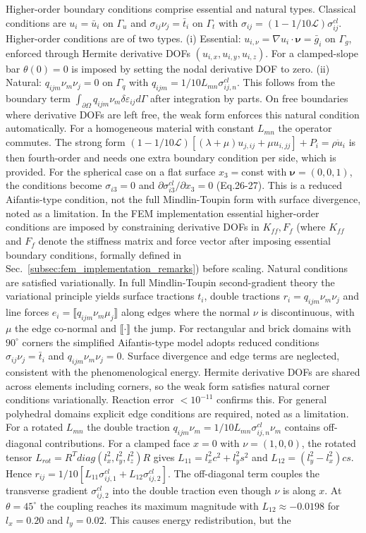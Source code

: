 \documentclass[final,3p,times,fleqn]{elsarticle}
\begin{document}
Higher-order boundary conditions comprise essential and natural types. Classical conditions are $u_i=\bar{u}_i$ on $\Gamma_u$ and $\sigma_{ij}\nu_j=\bar{t}_i$ on $\Gamma_t$ with $\sigma_{ij}=(1-1/10\mathcal{L})\sigma^{cl}_{ij}$. Higher-order conditions are of two types. (i) Essential: $u_{i,\nu}=\nabla u_i\cdot\boldsymbol{\nu}=\bar{g}_i$ on $\Gamma_g$, enforced through Hermite derivative DOFs $(u_{i,x},u_{i,y},u_{i,z})$. For a clamped-slope bar $\theta(0)=0$ is imposed by setting the nodal derivative DOF to zero. (ii) Natural: $q_{ijm}\nu_m\nu_j=0$ on $\Gamma_q$ with $q_{ijm}=1/10 L_{mn}\sigma^{cl}_{ij,n}$. This follows from the boundary term $\int_{\partial\Omega} q_{ijm}\nu_m\delta\varepsilon_{ij} d\Gamma$ after integration by parts. On free boundaries where derivative DOFs are left free, the weak form enforces this natural condition automatically. For a homogeneous material with constant $L_{mn}$ the operator commutes. The strong form $(1-1/10\mathcal{L})[(\lambda+\mu)u_{j,ij}+\mu u_{i,jj}]+P_i=\rho\ddot{u}_i$ is then fourth-order and needs one extra boundary condition per side, which is provided. For the spherical case on a flat surface $x_3=$const with $\boldsymbol{\nu}=(0,0,1)$, the conditions become $\sigma_{i3}=0$ and $\partial\sigma^{cl}_{i3}/\partial x_3=0$ (Eq.26-27). This is a reduced Aifantis-type condition, not the full Mindlin-Toupin form with surface divergence, noted as a limitation. In the FEM implementation essential higher-order conditions are imposed by constraining derivative DOFs in $K_{ff},F_f$ (where $K_{ff}$ and $F_f$ denote the stiffness matrix and force vector after imposing essential boundary conditions, formally defined in Sec.~\ref{subsec:fem_implementation_remarks}) before scaling. Natural conditions are satisfied variationally. In full Mindlin-Toupin second-gradient theory the variational principle yields surface tractions $t_i$, double tractions $r_i=q_{ijm}\nu_m\nu_j$ and line forces $e_i=\llbracket q_{ijm}\nu_m\mu_j\rrbracket$ along edges where the normal $\nu$ is discontinuous, with $\mu$ the edge co-normal and $\llbracket\cdot\rrbracket$ the jump. For rectangular and brick domains with $90^\circ$ corners the simplified Aifantis-type model adopts reduced conditions $\sigma_{ij}\nu_j=\bar{t}_i$ and $q_{ijm}\nu_m\nu_j=0$. Surface divergence and edge terms are neglected, consistent with the phenomenological energy. Hermite derivative DOFs are shared across elements including corners, so the weak form satisfies natural corner conditions variationally. Reaction error $<10^{-11}$ confirms this. For general polyhedral domains explicit edge conditions are required, noted as a limitation. For a rotated $L_{mn}$ the double traction $q_{ijm}\nu_m=1/10 L_{mn}\sigma^{cl}_{ij,n}\nu_m$ contains off-diagonal contributions. For a clamped face $x=0$ with $\nu=(1,0,0)$, the rotated tensor $L_{rot}=R^T diag(l_x^2,l_y^2,l_z^2)R$ gives $L_{11}=l_x^2c^2+l_y^2s^2$ and $L_{12}=(l_y^2-l_x^2)cs$. Hence $r_{ij}=1/10[L_{11}\sigma^{cl}_{ij,1}+L_{12}\sigma^{cl}_{ij,2}]$. The off-diagonal term couples the transverse gradient $\sigma^{cl}_{ij,2}$ into the double traction even though $\nu$ is along $x$. At $\theta=45^\circ$ the coupling reaches its maximum magnitude with $L_{12}\approx-0.0198$ for $l_x=0.20$ and $l_y=0.02$. This causes energy redistribution, but the 
\end{document}
